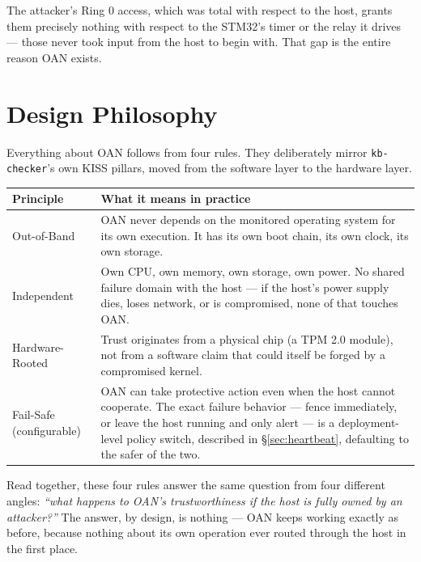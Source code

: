 \documentclass[11pt,a4paper]{article}
\begin{document}
The attacker's Ring 0 access, which was total with respect to the host,
grants them precisely nothing with respect to the STM32's timer or the
relay it drives --- those never took input from the host to begin with.
That gap is the entire reason OAN exists.

\section{Design Philosophy}
\label{sec:philosophy}

Everything about OAN follows from four rules. They deliberately mirror
\texttt{kb-checker}'s own KISS pillars, moved from the software layer to
the hardware layer.

\begin{center}
\renewcommand{\arraystretch}{1.35}
\begin{tabular}{@{}p{3.1cm}p{10.6cm}@{}}
\toprule
\textbf{Principle} & \textbf{What it means in practice} \\
\midrule
Out-of-Band & OAN never depends on the monitored operating system for
its own execution. It has its own boot chain, its own clock, its own
storage. \\
Independent & Own CPU, own memory, own storage, own power. No shared
failure domain with the host --- if the host's power supply dies,
loses network, or is compromised, none of that touches OAN. \\
Hardware-Rooted & Trust originates from a physical chip (a TPM 2.0
module), not from a software claim that could itself be forged by a
compromised kernel. \\
Fail-Safe (configurable) & OAN can take protective action even when
the host cannot cooperate. The exact failure behavior --- fence
immediately, or leave the host running and only alert --- is a
deployment-level policy switch, described in \S\ref{sec:heartbeat},
defaulting to the safer of the two. \\
\bottomrule
\end{tabular}
\end{center}

Read together, these four rules answer the same question from four
different angles: \emph{``what happens to OAN's trustworthiness if the
host is fully owned by an attacker?''} The answer, by design, is
nothing --- OAN keeps working exactly as before, because nothing about
its own operation ever routed through the host in the first place.
\end{document}
